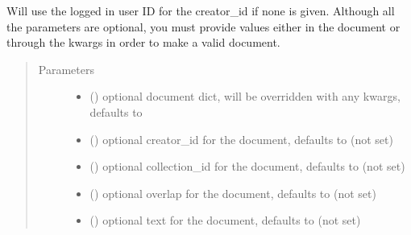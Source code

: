 \documentclass[letterpaper,10pt,english]{sphinxmanual}
\begin{document}
\begin{fulllineitems}
\begin{fulllineitems}
\sphinxAtStartPar
Will use the logged in user ID for the creator\_id if none is given.  Although all the
parameters are optional, you must provide values either in the document or through the
kwargs in order to make a valid document.
\begin{quote}\begin{description}
\item[{Parameters}] \leavevmode\begin{itemize}
\item {} 
\sphinxAtStartPar
{} (\sphinxstyleliteralemphasis{\sphinxupquote{, }}) \textendash{} optional document dict, will be overridden with any kwargs, defaults to \sphinxcode{\sphinxupquote{\{\}}}

\item {} 
\sphinxAtStartPar
{} (\sphinxstyleliteralemphasis{\sphinxupquote{, }}) \textendash{} optional creator\_id for the document, defaults to  (not set)

\item {} 
\sphinxAtStartPar
{} (\sphinxstyleliteralemphasis{\sphinxupquote{, }}) \textendash{} optional collection\_id for the document, defaults to  (not set)

\item {} 
\sphinxAtStartPar
{} (\sphinxstyleliteralemphasis{\sphinxupquote{, }}) \textendash{} optional overlap for the document, defaults to  (not set)

\item {} 
\sphinxAtStartPar
{} (\sphinxstyleliteralemphasis{\sphinxupquote{, }}) \textendash{} optional text for the document, defaults to  (not set)


\end{itemize}
\end{description}
\end{quote}
\end{fulllineitems}
\end{fulllineitems}
\end{document}
